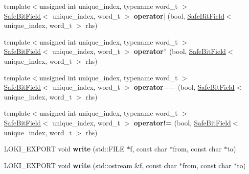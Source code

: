 \begin{DoxyCompactItemize}
\item 
\hypertarget{namespaceLoki_a7506de2636e0748710fdcb59f8981da7}{}{\footnotesize template$<$unsigned int unique\+\_\+index, typename word\+\_\+t $>$ }\\\hyperlink{classLoki_1_1SafeBitField}{Safe\+Bit\+Field}$<$ unique\+\_\+index, word\+\_\+t $>$ {\bfseries operator$\vert$} (bool, \hyperlink{classLoki_1_1SafeBitField}{Safe\+Bit\+Field}$<$ unique\+\_\+index, word\+\_\+t $>$ rhs)\label{namespaceLoki_a7506de2636e0748710fdcb59f8981da7}

\item 
\hypertarget{namespaceLoki_a03b8284f7ace932d2d7f70ca3f19255f}{}{\footnotesize template$<$unsigned int unique\+\_\+index, typename word\+\_\+t $>$ }\\\hyperlink{classLoki_1_1SafeBitField}{Safe\+Bit\+Field}$<$ unique\+\_\+index, word\+\_\+t $>$ {\bfseries operator$^\wedge$} (bool, \hyperlink{classLoki_1_1SafeBitField}{Safe\+Bit\+Field}$<$ unique\+\_\+index, word\+\_\+t $>$ rhs)\label{namespaceLoki_a03b8284f7ace932d2d7f70ca3f19255f}

\item 
\hypertarget{namespaceLoki_ae9541761170ff95ad749c3804bb338eb}{}{\footnotesize template$<$unsigned int unique\+\_\+index, typename word\+\_\+t $>$ }\\\hyperlink{classLoki_1_1SafeBitField}{Safe\+Bit\+Field}$<$ unique\+\_\+index, word\+\_\+t $>$ {\bfseries operator==} (bool, \hyperlink{classLoki_1_1SafeBitField}{Safe\+Bit\+Field}$<$ unique\+\_\+index, word\+\_\+t $>$ rhs)\label{namespaceLoki_ae9541761170ff95ad749c3804bb338eb}

\item 
\hypertarget{namespaceLoki_ab51df3aba12580f35dee5f1356570fac}{}{\footnotesize template$<$unsigned int unique\+\_\+index, typename word\+\_\+t $>$ }\\\hyperlink{classLoki_1_1SafeBitField}{Safe\+Bit\+Field}$<$ unique\+\_\+index, word\+\_\+t $>$ {\bfseries operator!=} (bool, \hyperlink{classLoki_1_1SafeBitField}{Safe\+Bit\+Field}$<$ unique\+\_\+index, word\+\_\+t $>$ rhs)\label{namespaceLoki_ab51df3aba12580f35dee5f1356570fac}

\item 
\hypertarget{namespaceLoki_a81baa99352826378b3923bfff6d3a323}{}L\+O\+K\+I\+\_\+\+E\+X\+P\+O\+R\+T void {\bfseries write} (std\+::\+F\+I\+L\+E $\ast$f, const char $\ast$from, const char $\ast$to)\label{namespaceLoki_a81baa99352826378b3923bfff6d3a323}

\item 
\hypertarget{namespaceLoki_a92179738a2a2246f8c57047816de0fc0}{}L\+O\+K\+I\+\_\+\+E\+X\+P\+O\+R\+T void {\bfseries write} (std\+::ostream \&f, const char $\ast$from, const char $\ast$to)\label{namespaceLoki_a92179738a2a2246f8c57047816de0fc0}


\end{DoxyCompactItemize}
